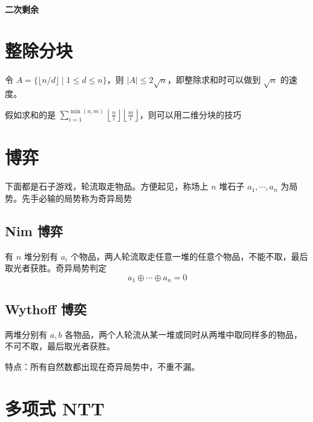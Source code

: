 \documentclass{probook}
\begin{document}
\begin{multicols}{2}


\paragraph{二次剩余}





\section{整除分块}
令 $A = \{ \lfloor n/d \rfloor \mid 1 \leqslant d \leqslant n \}$，则 $|A| \leqslant 2\sqrt{n}$，即整除求和时可以做到 $\sqrt{n}$ 的速度。



假如求和的是 $\sum\limits_{i=1}^{\min(n,m)} \left\lfloor \frac{n}{i} \right\rfloor\left\lfloor \frac{m}{i} \right\rfloor$，则可以用二维分块的技巧




\section{博弈}

下面都是石子游戏，轮流取走物品。方便起见，称场上 $n$ 堆石子 $a_1,\cdots,a_n$ 为局势。先手必输的局势称为奇异局势

\subsection{Nim 博弈}

有 $n$ 堆分别有 $a_i$ 个物品，两人轮流取走任意一堆的任意个物品，不能不取，最后取光者获胜。奇异局势判定
\[a_1 \oplus \cdots \oplus a_n =0\]

\subsection{Wythoff 博奕}

两堆分别有 $a,b$ 各物品，两个人轮流从某一堆或同时从两堆中取同样多的物品，不可不取，最后取光者获胜。



特点：所有自然数都出现在奇异局势中，不重不漏。

\section{多项式 NTT}


\end{multicols}
\end{document}
